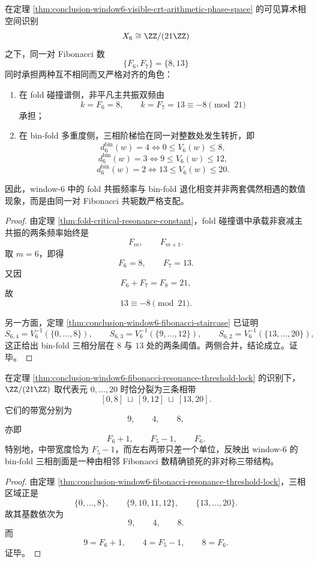 \begin{theorem}\label{thm:conclusion-window6-fibonacci-resonance-threshold-lock}
在定理 \ref{thm:conclusion-window6-visible-crt-arithmetic-phase-space} 的可见算术相空间识别
\[
X_6\cong \ZZ/(21\ZZ)
\]
之下，同一对 Fibonacci 数
\[
\{F_6,F_7\}=\{8,13\}
\]
同时承担两种互不相同而又严格对齐的角色：
\begin{enumerate}
  \item 在 fold 碰撞谱侧，非平凡主共振双频由
  \[
  k=F_6=8,
  \qquad
  k=F_7=13\equiv -8 \pmod{21}
  \]
  承担；
  \item 在 bin-fold 多重度侧，三相阶梯恰在同一对整数处发生转折，即
  \[
  d_6^{\mathrm{bin}}(w)=4
  \iff
  0\le V_6(w)\le 8,
  \]
  \[
  d_6^{\mathrm{bin}}(w)=3
  \iff
  9\le V_6(w)\le 12,
  \]
  \[
  d_6^{\mathrm{bin}}(w)=2
  \iff
  13\le V_6(w)\le 20.
  \]
\end{enumerate}
因此，window-\(6\) 中的 fold 共振频率与 bin-fold 退化相变并非两套偶然相遇的数值现象，而是由同一对 Fibonacci 共轭数严格支配。
\end{theorem}
\begin{proof}
由定理 \ref{thm:fold-critical-resonance-constant}，fold 碰撞谱中承载非衰减主共振的两条频率始终是
\[
F_m,\qquad F_{m+1}.
\]
取 \(m=6\)，即得
\[
F_6=8,\qquad F_7=13.
\]
又因
\[
F_6+F_7=F_8=21,
\]
故
\[
13\equiv -8\pmod{21}.
\]

另一方面，定理 \ref{thm:conclusion-window6-fibonacci-staircase} 已证明
\[
S_{6,4}=V_6^{-1}(\{0,\dots,8\}),
\qquad
S_{6,3}=V_6^{-1}(\{9,\dots,12\}),
\qquad
S_{6,2}=V_6^{-1}(\{13,\dots,20\}),
\]
这正给出 bin-fold 三相分层在 \(8\) 与 \(13\) 处的两条阈值。两侧合并，结论成立。证毕。
\end{proof}

\begin{corollary}\label{cor:conclusion-window6-fibonacci-threeband-profile}
在定理 \ref{thm:conclusion-window6-fibonacci-resonance-threshold-lock} 的识别下，\(\ZZ/(21\ZZ)\) 取代表元 \(0,\dots,20\) 时恰分裂为三条相带
\[
[0,8]\ \sqcup\ [9,12]\ \sqcup\ [13,20].
\]
它们的带宽分别为
\[
9,\qquad 4,\qquad 8,
\]
亦即
\[
F_6+1,\qquad F_5-1,\qquad F_6.
\]
特别地，中带宽度恰为 \(F_5-1\)，而左右两带只差一个单位，反映出
window-\(6\) 的 bin-fold 三相剖面是一种由相邻 Fibonacci 数精确锁死的非对称三带结构。
\end{corollary}
\begin{proof}
由定理 \ref{thm:conclusion-window6-fibonacci-resonance-threshold-lock}，三相区域正是
\[
\{0,\dots,8\},\qquad \{9,10,11,12\},\qquad \{13,\dots,20\}.
\]
故其基数依次为
\[
9,\qquad 4,\qquad 8.
\]
而
\[
9=F_6+1,\qquad 4=F_5-1,\qquad 8=F_6.
\]
证毕。
\end{proof}

